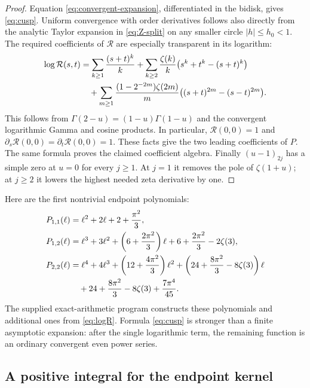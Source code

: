 \begin{proof}
Equation \eqref{eq:convergent-expansion}, differentiated in the bidisk,
gives \eqref{eq:cusp}. Uniform convergence with order derivatives follows
also directly from the analytic Taylor expansion in \eqref{eq:Z-split}
on any smaller circle $|h|\leq h_0<1$.
The required coefficients of $\mathcal R$ are especially transparent in
its logarithm:
\begin{align}
 \log\mathcal R(s,t)
 &=\sum_{k\geq1}\frac{(s+t)^k}{k}
   +\sum_{k\geq2}\frac{\zeta(k)}k
      \bigl(s^k+t^k-(s+t)^k\bigr)\notag\\
 &\quad+\sum_{m\geq1}\frac{(1-2^{-2m})\zeta(2m)}m
      \bigl((s+t)^{2m}-(s-t)^{2m}\bigr).
 \label{eq:logR}
\end{align}
This follows from $\Gamma(2-u)=(1-u)\Gamma(1-u)$ and the convergent
logarithmic Gamma and cosine products. In particular,
$\mathcal R(0,0)=1$ and $\partial_s\mathcal R(0,0)
=\partial_t\mathcal R(0,0)=1$. These facts give the two leading
coefficients of $P$. The same formula proves the claimed coefficient
algebra. Finally $(u-1)_{2j}$ has a simple zero at $u=0$ for every
$j\geq1$. At $j=1$ it removes the pole of $\zeta(1+u)$; at $j\geq2$
it lowers the highest needed zeta derivative by one.
\end{proof}

Here are the first nontrivial endpoint polynomials:
\begin{align}
 P_{1,1}(\ell)&=\ell^2+2\ell+2+\frac{\pi^2}{3},\label{eq:P11}\\
 P_{1,2}(\ell)&=\ell^3+3\ell^2+
       \left(6+\frac{2\pi^2}{3}\right)\ell
       +6+\frac{2\pi^2}{3}-2\zeta(3),\label{eq:P12}\\
 P_{2,2}(\ell)&=\ell^4+4\ell^3+
       \left(12+\frac{4\pi^2}{3}\right)\ell^2
       +\left(24+\frac{8\pi^2}{3}-8\zeta(3)\right)\ell\notag\\
 &\quad+24+\frac{8\pi^2}{3}-8\zeta(3)+\frac{7\pi^4}{45}.
 \label{eq:P22}
\end{align}
The supplied exact-arithmetic program constructs these polynomials and
additional ones from \eqref{eq:logR}. Formula \eqref{eq:cusp} is stronger
than a finite asymptotic expansion: after the single logarithmic term,
the remaining function is an ordinary convergent even power series.

\subsection{A positive integral for the endpoint kernel}

